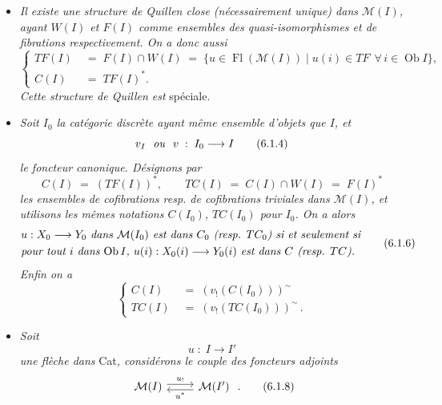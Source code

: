 \documentclass[11pt]{article}
\newcommand{\printedpage}[1]{\marginpar{\footnotesize p.~#1}}
\newcommand{\msp}[1]{\marginpar{\footnotesize [#1]}}
\newcommand{\Fl}{\operatorname{Fl}}
\newcommand{\Ob}{\operatorname{Ob}}
\newcommand{\tl}{^{\sim}}
\begin{document}
\begin{itemize}[leftmargin=2.5em]
\item[a)] \textit{Il existe une structure de Quillen close (nécessairement unique) dans $\mathcal{M}(I)$, ayant $W(I)$ et $F(I)$ comme ensembles des quasi-isomorphismes et de fibrations respectivement. On a donc aussi}
\[
\left\{
\begin{aligned}
TF(I) \;&=\; F(I)\cap W(I) \;=\; \{u\in \Fl(\mathcal{M}(I)) \mid u(i)\in TF \ \ \forall\, i\in \Ob I\},\\
C(I) \;&=\; TF(I)^{*}.
\end{aligned}
\right.
\tag*{(6.1.3)}
\]
\textit{Cette structure de Quillen est} spéciale.

\msp{page 99}
\item[b)] \textit{Soit $I_0$ la catégorie discrète ayant même ensemble d'objets que $I$, et}
\[
v_I \ \ \text{\textit{ou}}\ \ v \;:\; I_0 \longrightarrow I
\tag*{(6.1.4)}
\]
\textit{le foncteur canonique. Désignons par}
\[
C(I) \;=\; (TF(I))^{*}, \qquad TC(I) \;=\; C(I)\cap W(I) \;=\; F(I)^{*}
\tag*{(6.1.5)}
\]
\textit{les ensembles de cofibrations resp. de cofibrations triviales dans $\mathcal{M}(I)$, et utilisons les mêmes notations $C(I_0)$, $TC(I_0)$ pour $I_0$. On a alors}
\[
\begin{aligned}
&\text{\textit{$u : X_0 \longrightarrow Y_0$ dans $\mathcal{M}(I_0)$ est dans $C_0$ (resp. $TC_0$) si et seulement si}}\\
&\text{\textit{pour tout $i$ dans $\Ob I$, $u(i) : X_0(i) \longrightarrow Y_0(i)$ est dans $C$ (resp. $TC$).}}
\end{aligned}
\tag*{(6.1.6)}
\]
\textit{Enfin on a}
\[
\left\{
\begin{aligned}
C(I) \;&=\; (v_!(C(I_0)))\tl\\
TC(I) \;&=\; (v_!(TC(I_0)))\tl\,.
\end{aligned}
\right.
\tag*{(6.1.7)} %
\]

\item[c)] \textit{Soit}
\[
u \;:\; I \longrightarrow I'
\]
\textit{une flèche dans} Cat\textit{, considérons le couple des foncteurs adjoints}
\[
\begin{tikzcd}
\mathcal{M}(I) \arrow[r, shift left, "u_!"] & \mathcal{M}(I') \arrow[l, shift left, "u^{*}"]
\end{tikzcd}
\;.
\tag*{(6.1.8)}
\]

\printedpage{50}


\end{itemize}
\end{document}
